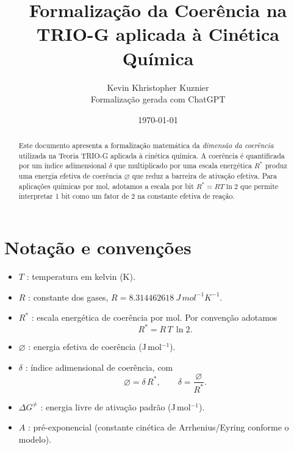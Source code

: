 \documentclass[a4paper,12pt]{article}
\title{Formalização da Coerência na TRIO-G aplicada à Cinética Química}
\author{Kevin Khristopher Kuznier \\ Formalização gerada com ChatGPT}
\date{\today}
\begin{document}
\maketitle

\begin{abstract}
Este documento apresenta a formalização matemática da \emph{dimensão da coerência} utilizada na Teoria TRIO-G aplicada à cinética química. A coerência é quantificada por um índice adimensional $\delta$ que multiplicado por uma escala energética $R^*$ produz uma energia efetiva de coerência $\varnothing$ que reduz a barreira de ativação efetiva. Para aplicações químicas por mol, adotamos a escala por bit $R^* = R T \ln 2$ que permite interpretar 1 bit como um fator de 2 na constante efetiva de reação.
\end{abstract}

\section{Notação e convenções}
\begin{itemize}
  \item $T$ : temperatura em kelvin (K).
  \item $R$ : constante dos gases, $R=\SI{8.314462618}{J\,mol^{-1}K^{-1}}$.
  \item $R^{*}$ : escala energética de coerência por mol. Por convenção adotamos
    \begin{equation}
      R^{*}=R\,T\,\ln 2.
    \end{equation}
  \item $\varnothing$ : energia efetiva de coerência (J\,mol$^{-1}$).
  \item $\delta$ : índice adimensional de coerência, com
    \begin{equation}
      \varnothing=\delta\,R^{*}, \qquad \delta=\frac{\varnothing}{R^{*}}.
    \end{equation}
  \item $\Delta G^{\neq}$ : energia livre de ativação padrão (J\,mol$^{-1}$).
  \item $A$ : pré-exponencial (constante cinética de Arrhenius/Eyring conforme o modelo).
\end{itemize}
\end{document}
